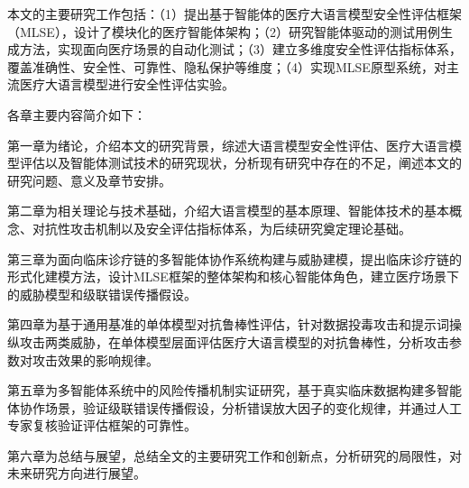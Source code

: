 本文的主要研究工作包括：（1）提出基于智能体的医疗大语言模型安全性评估框架（MLSE），设计了模块化的医疗智能体架构；（2）研究智能体驱动的测试用例生成方法，实现面向医疗场景的自动化测试；（3）建立多维度安全性评估指标体系，覆盖准确性、安全性、可靠性、隐私保护等维度；（4）实现MLSE原型系统，对主流医疗大语言模型进行安全性评估实验。

各章主要内容简介如下：

第一章为绪论，介绍本文的研究背景，综述大语言模型安全性评估、医疗大语言模型评估以及智能体测试技术的研究现状，分析现有研究中存在的不足，阐述本文的研究问题、意义及章节安排。

第二章为相关理论与技术基础，介绍大语言模型的基本原理、智能体技术的基本概念、对抗性攻击机制以及安全评估指标体系，为后续研究奠定理论基础。

第三章为面向临床诊疗链的多智能体协作系统构建与威胁建模，提出临床诊疗链的形式化建模方法，设计MLSE框架的整体架构和核心智能体角色，建立医疗场景下的威胁模型和级联错误传播假设。

第四章为基于通用基准的单体模型对抗鲁棒性评估，针对数据投毒攻击和提示词操纵攻击两类威胁，在单体模型层面评估医疗大语言模型的对抗鲁棒性，分析攻击参数对攻击效果的影响规律。

第五章为多智能体系统中的风险传播机制实证研究，基于真实临床数据构建多智能体协作场景，验证级联错误传播假设，分析错误放大因子的变化规律，并通过人工专家复核验证评估框架的可靠性。

第六章为总结与展望，总结全文的主要研究工作和创新点，分析研究的局限性，对未来研究方向进行展望。
